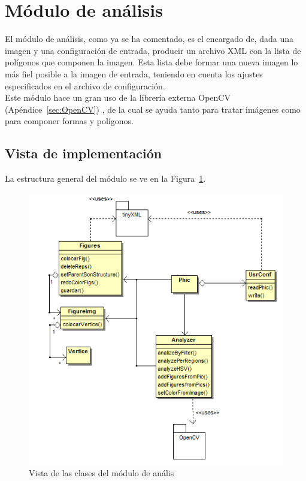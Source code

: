 \section{Módulo de análisis}
\label{sec:modanal}


El módulo de análisis, como ya se ha comentado, es el encargado de, dada una imagen y una configuración de entrada, producir un archivo XML con la lista de polígonos que componen la imagen. Esta lista debe formar una nueva imagen lo más fiel posible a la imagen de entrada, teniendo en cuenta los ajustes especificados en el archivo de configuración.\\

Este módulo hace un gran uso de la librería externa OpenCV (Apéndice~\ref{sec:OpenCV}) , de la cual se ayuda tanto para tratar imágenes como para componer formas y polígonos.

\subsection{Vista de implementación}

La estructura general del módulo se ve en la Figura~\ref{fig:diagramaclasesPHIC}.\\

		\begin{figure}[htbp]
		\centering
		\includegraphics[scale=0.6]{graphics/diagramaclasesPHIC.png}
		\caption{Vista de las clases del módulo de anális}
		\label{fig:diagramaclasesPHIC}
		\end{figure}
		
